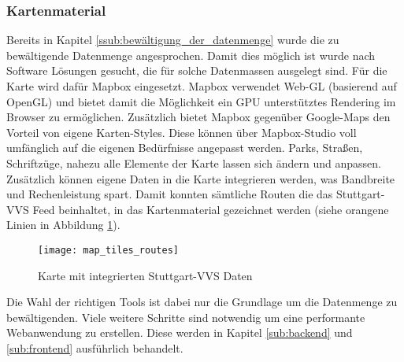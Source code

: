     \subsubsection*{Kartenmaterial}
    \label{ssub:kartenmaterial}
      Bereits in Kapitel \ref{ssub:bewältigung_der_datenmenge} wurde die zu bewältigende Datenmenge angesprochen. Damit dies möglich ist wurde nach Software Lösungen gesucht, die für solche Datenmassen ausgelegt sind. Für die Karte wird dafür Mapbox eingesetzt. Mapbox verwendet Web-GL (basierend auf OpenGL) und bietet damit die Möglichkeit ein GPU unterstütztes Rendering im Browser zu ermöglichen. Zusätzlich bietet Mapbox gegenüber Google-Maps den Vorteil von eigene Karten-Styles. Diese können über Mapbox-Studio voll umfänglich auf die eigenen Bedürfnisse angepasst werden. Parks, Straßen, Schriftzüge, nahezu alle Elemente der Karte lassen sich ändern und anpassen. Zusätzlich können eigene Daten in die Karte integrieren werden, was Bandbreite und Rechenleistung spart. Damit konnten sämtliche Routen die das Stuttgart-VVS Feed beinhaltet, in das Kartenmaterial gezeichnet werden (siehe orangene Linien in Abbildung \ref{fig:map_tiles_routes}).

      \begin{figure}[htbp]
        \begin{center}
          \texttt{[image: map\_tiles\_routes]}
          \caption{Karte mit integrierten Stuttgart-VVS Daten}
          \label{fig:map_tiles_routes}
        \end{center}
      \end{figure}
      
      Die Wahl der richtigen Tools ist dabei nur die Grundlage um die Datenmenge zu bewältigenden. Viele weitere Schritte sind notwendig um eine performante Webanwendung zu erstellen. Diese werden in Kapitel \ref{sub:backend}  und \ref{sub:frontend}  ausführlich behandelt.

      
